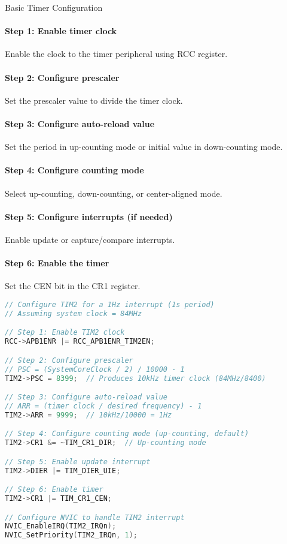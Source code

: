 \multend

\begin{KR}{Basic Timer Configuration}
\paragraph{Step 1: Enable timer clock}
Enable the clock to the timer peripheral using RCC register.
\paragraph{Step 2: Configure prescaler}
Set the prescaler value to divide the timer clock.
\paragraph{Step 3: Configure auto-reload value}
Set the period in up-counting mode or initial value in down-counting mode.
\paragraph{Step 4: Configure counting mode}
Select up-counting, down-counting, or center-aligned mode.
\paragraph{Step 5: Configure interrupts (if needed)}
Enable update or capture/compare interrupts.
\paragraph{Step 6: Enable the timer}
Set the CEN bit in the CR1 register.

\begin{lstlisting}[language=C, style=basesmol]
// Configure TIM2 for a 1Hz interrupt (1s period)
// Assuming system clock = 84MHz

// Step 1: Enable TIM2 clock
RCC->APB1ENR |= RCC_APB1ENR_TIM2EN;

// Step 2: Configure prescaler
// PSC = (SystemCoreClock / 2) / 10000 - 1
TIM2->PSC = 8399;  // Produces 10kHz timer clock (84MHz/8400)

// Step 3: Configure auto-reload value
// ARR = (timer clock / desired frequency) - 1
TIM2->ARR = 9999;  // 10kHz/10000 = 1Hz

// Step 4: Configure counting mode (up-counting, default)
TIM2->CR1 &= ~TIM_CR1_DIR;  // Up-counting mode

// Step 5: Enable update interrupt
TIM2->DIER |= TIM_DIER_UIE;

// Step 6: Enable timer
TIM2->CR1 |= TIM_CR1_CEN;

// Configure NVIC to handle TIM2 interrupt
NVIC_EnableIRQ(TIM2_IRQn);
NVIC_SetPriority(TIM2_IRQn, 1);
\end{lstlisting}
\end{KR}

